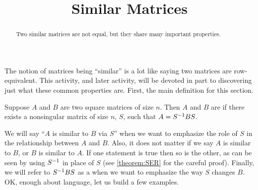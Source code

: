 \documentclass{ximera}
\title{Similar Matrices}
\begin{document}
\begin{abstract}
Two similar matrices are not equal, but they share many important properties.
\end{abstract}
\maketitle

The notion of matrices being ``similar'' is a lot like saying two
matrices are row-equivalent.  This activity, and later activity, will
be devoted in part to discovering just what these common properties
are.  First, the main definition for this section.

\begin{definition}
  Suppose $A$ and $B$ are two square matrices of size $n$.  Then $A$
  and $B$ are  if there exists a nonsingular matrix of
  size $n$, $S$, such that $A=S^{-1}BS$.
\end{definition}

We will say ``$A$ is similar to $B$ via $S$'' when we want to
emphasize the role of $S$ in the relationship between $A$ and $B$.
Also, it does not matter if we say $A$ is similar to $B$, or $B$ is
similar to $A$.  If one statement is true then so is the other, as can
be seen by using $S^{-1}$ in place of $S$ (see \ref{theorem:SER}
for the careful proof).  Finally, we will refer to $S^{-1}BS$ as
a  when we want to emphasize the way
$S$ changes $B$.  OK, enough about language, let us build a few
examples.
\end{document}
